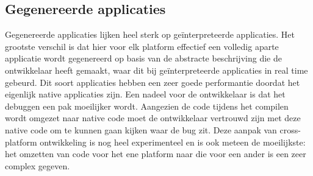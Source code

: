 \subsection{Gegenereerde applicaties}
\label{subsec:generatedApps}

Gegenereerde applicaties lijken heel sterk op geïnterpreteerde applicaties. Het grootste verschil is dat hier voor elk platform effectief een volledig aparte applicatie wordt gegenereerd op basis van de abstracte beschrijving die de ontwikkelaar heeft gemaakt, waar dit bij geïnterpreteerde applicaties in real time gebeurd. Dit soort applicaties hebben een zeer goede performantie doordat het eigenlijk native applicaties zijn. Een nadeel voor de ontwikkelaar is dat het debuggen een pak moeilijker wordt. Aangezien de code tijdens het compilen wordt omgezet naar native code moet de ontwikkelaar vertrouwd zijn met deze native code om te kunnen gaan kijken waar de bug zit. Deze aanpak van cross-platform ontwikkeling is nog heel experimenteel en is ook meteen de moeilijkste: het omzetten van code voor het ene platform naar die voor een ander is een zeer complex gegeven.



